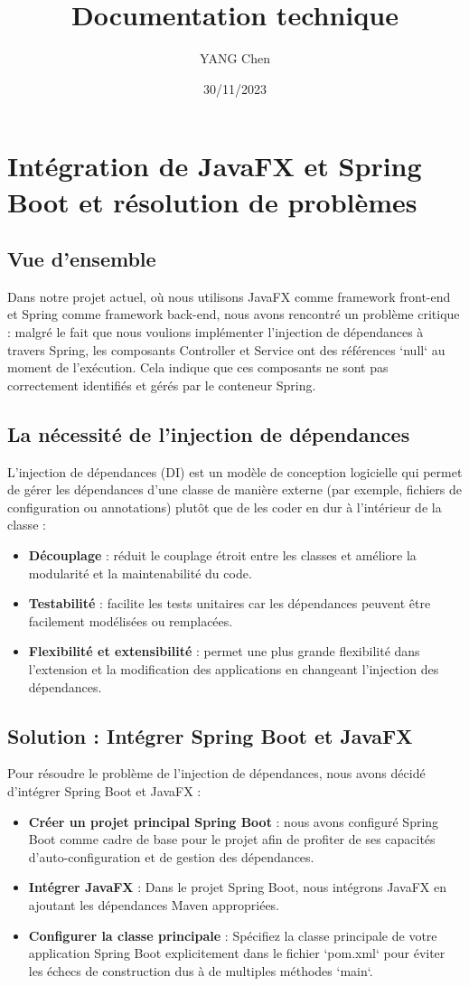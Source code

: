 \documentclass{article}
\title{Documentation technique}
\date{30/11/2023}
\author{YANG Chen}
\begin{document}
\maketitle
\tableofcontents
\newpage
\section{Intégration de JavaFX et Spring Boot et résolution de problèmes}
\subsection{Vue d'ensemble}
  Dans notre projet actuel, où nous utilisons JavaFX comme framework front-end et Spring comme framework back-end, nous avons rencontré un problème critique : malgré le fait que nous voulions implémenter l'injection de dépendances à travers Spring, les composants Controller et Service ont des références `null` au moment de l'exécution. Cela indique que ces composants ne sont pas correctement identifiés et gérés par le conteneur Spring.
\subsection{La nécessité de l'injection de dépendances}
L'injection de dépendances (DI) est un modèle de conception logicielle qui permet de gérer les dépendances d'une classe de manière externe (par exemple, fichiers de configuration ou annotations) plutôt que de les coder en dur à l'intérieur de la classe :
\begin{itemize}
  \item \textbf{Découplage} : réduit le couplage étroit entre les classes et améliore la modularité et la maintenabilité du code.
  \item \textbf{Testabilité} : facilite les tests unitaires car les dépendances peuvent être facilement modélisées ou remplacées.
  \item \textbf{Flexibilité et extensibilité} : permet une plus grande flexibilité dans l'extension et la modification des applications en changeant l'injection des dépendances.
\end{itemize}
\subsection{Solution : Intégrer Spring Boot et JavaFX}
Pour résoudre le problème de l'injection de dépendances, nous avons décidé d'intégrer Spring Boot et JavaFX :
\begin{itemize}
  \item \textbf{Créer un projet principal Spring Boot} : nous avons configuré Spring Boot comme cadre de base pour le projet afin de profiter de ses capacités d'auto-configuration et de gestion des dépendances.
  \item \textbf{Intégrer JavaFX} : Dans le projet Spring Boot, nous intégrons JavaFX en ajoutant les dépendances Maven appropriées.
  \item \textbf{Configurer la classe principale} : Spécifiez la classe principale de votre application Spring Boot explicitement dans le fichier `pom.xml` pour éviter les échecs de construction dus à de multiples méthodes `main`.
\end{itemize}
\end{document}

